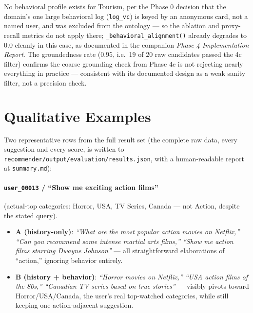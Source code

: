 \documentclass[11pt,a4paper]{article}
\newcommand{\code}[1]{\texttt{#1}}
\begin{document}
No behavioral profile exists for Tourism, per the Phase 0 decision that the domain's one large
behavioral log (\code{log\_vc}) is keyed by an anonymous card, not a named user, and was excluded
from the ontology --- so the ablation and proxy-recall metrics do not apply there;
\code{\_behavioral\_alignment()} already degrades to $0.0$ cleanly in this case, as documented in
the companion \emph{Phase 4 Implementation Report}. The groundedness rate ($0.95$, i.e.\ 19 of 20
raw candidates passed the 4c filter) confirms the coarse grounding check from Phase 4c is not
rejecting nearly everything in practice --- consistent with its documented design as a weak sanity
filter, not a precision check.

\newpage
\section{Qualitative Examples}
\label{sec:qual}

Two representative rows from the full result set (the complete raw data, every suggestion and every
score, is written to \code{recommender/output/evaluation/results.json}, with a human-readable
report at \code{summary.md}):

\paragraph{\code{user\_00013} / ``Show me exciting action films''} (actual-top categories: Horror,
USA, TV Series, Canada --- not Action, despite the stated query).

\begin{itemize}
    \item \textbf{A (history-only)}: \emph{``What are the most popular action movies on
        Netflix,'' ``Can you recommend some intense martial arts films,'' ``Show me action films
        starring Dwayne Johnson''} --- all straightforward elaborations of ``action,'' ignoring
        behavior entirely.
    \item \textbf{B (history + behavior)}: \emph{``Horror movies on Netflix,'' ``USA action films
        of the 80s,'' ``Canadian TV series based on true stories''} --- visibly pivots toward
        Horror/USA/Canada, the user's real top-watched categories, while still keeping one
        action-adjacent suggestion.
\end{itemize}
\end{document}
